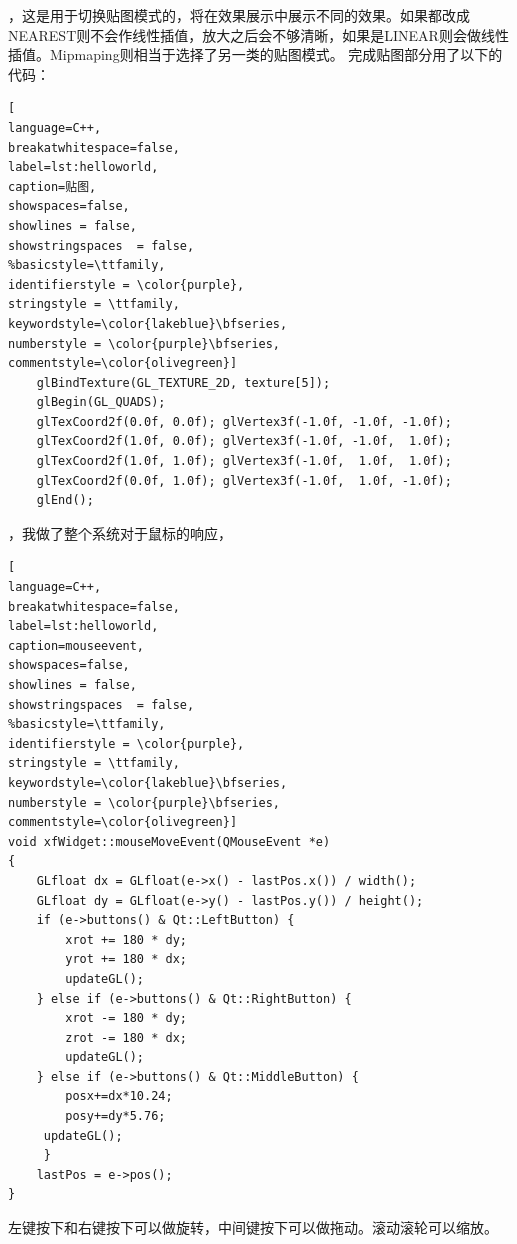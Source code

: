 \documentclass[12pt]{article}
\begin{document}
，这是用于切换贴图模式的，将在效果展示中展示不同的效果。如果都改成NEAREST则不会作线性插值，放大之后会不够清晰，如果是LINEAR则会做线性插值。Mipmaping则相当于选择了另一类的贴图模式。
完成贴图部分用了以下的代码：
\begin{lstlisting}[
language=C++, 
breakatwhitespace=false,
label=lst:helloworld, 
caption=贴图, 
showspaces=false,
showlines = false,
showstringspaces  = false,
%basicstyle=\ttfamily,
identifierstyle = \color{purple},
stringstyle = \ttfamily,
keywordstyle=\color{lakeblue}\bfseries,
numberstyle = \color{purple}\bfseries,
commentstyle=\color{olivegreen}]
    glBindTexture(GL_TEXTURE_2D, texture[5]);
    glBegin(GL_QUADS);
    glTexCoord2f(0.0f, 0.0f); glVertex3f(-1.0f, -1.0f, -1.0f);
    glTexCoord2f(1.0f, 0.0f); glVertex3f(-1.0f, -1.0f,  1.0f);
    glTexCoord2f(1.0f, 1.0f); glVertex3f(-1.0f,  1.0f,  1.0f);
    glTexCoord2f(0.0f, 1.0f); glVertex3f(-1.0f,  1.0f, -1.0f);
    glEnd();
\end{lstlisting}
，我做了整个系统对于鼠标的响应，	
\begin{lstlisting}[
language=C++, 
breakatwhitespace=false,
label=lst:helloworld, 
caption=mouseevent, 
showspaces=false,
showlines = false,
showstringspaces  = false,
%basicstyle=\ttfamily,
identifierstyle = \color{purple},
stringstyle = \ttfamily,
keywordstyle=\color{lakeblue}\bfseries,
numberstyle = \color{purple}\bfseries,
commentstyle=\color{olivegreen}]
void xfWidget::mouseMoveEvent(QMouseEvent *e)
{
    GLfloat dx = GLfloat(e->x() - lastPos.x()) / width();
    GLfloat dy = GLfloat(e->y() - lastPos.y()) / height();
    if (e->buttons() & Qt::LeftButton) {
        xrot += 180 * dy;
        yrot += 180 * dx;
        updateGL();
    } else if (e->buttons() & Qt::RightButton) {
        xrot -= 180 * dy;
        zrot -= 180 * dx;
        updateGL();
    } else if (e->buttons() & Qt::MiddleButton) {
        posx+=dx*10.24;
        posy+=dy*5.76;
     updateGL();
     }
    lastPos = e->pos();
}
\end{lstlisting}
左键按下和右键按下可以做旋转，中间键按下可以做拖动。滚动滚轮可以缩放。
\end{document}
